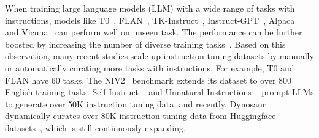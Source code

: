When training large language models (LLM) with a wide range of tasks with instructions, models like T0~\cite{sanh2021multitask}, FLAN~\cite{wei2021finetuned}, TK-Instruct~\cite{Wang2022SuperNaturalInstructionsGV}, Instruct-GPT~\cite{ouyang2022training}, Alpaca~\cite{alpaca} and Vicuna~\cite{vicuna2023} can perform well on unseen task.
The performance can be further boosted by increasing the number of diverse training tasks~\cite{xu2022zeroprompt,Wang2022SuperNaturalInstructionsGV, longpre2023flan, chung2022scaling}.
Based on this observation, many recent studies scale up instruction-tuning datasets by manually or automatically curating more tasks with instructions. 
For example, T0 and FLAN have 60 tasks. The NIV2~\cite{Wang2022SuperNaturalInstructionsGV} benchmark extends its dataset to over 800 English training tasks. Self-Instruct ~\cite{wang2022self} and Unnatural Instructions ~\cite{honovich2022unnatural} prompt LLMs to generate over 50K instruction tuning data, and recently, Dynosaur ~\cite{yin2023dynosaur} dynamically curates over 80K instruction tuning data from Huggingface datasets~\cite{lhoest-etal-2021-datasets}, which is still continuously expanding.

